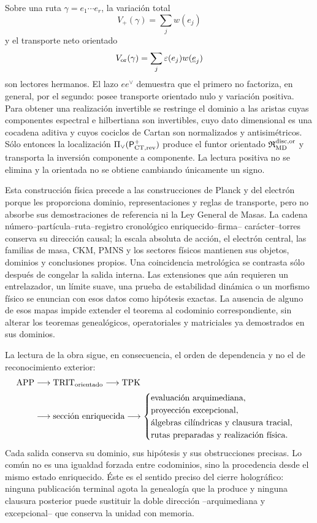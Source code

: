 Sobre una ruta \(\gamma=e_1\cdots e_r\), la variación total
\[
 V_+(\gamma)=\sum_jw(e_j)
\]
y el transporte neto orientado
\[
 V_{\rm or}(\gamma)=\sum_j\varepsilon(e_j)w(\underline e_j)
\]
son lectores hermanos. El lazo \(ee^\vee\) demuestra que el primero no
factoriza, en general, por el segundo: posee transporte orientado nulo y
variación positiva. Para obtener una realización invertible se restringe el
dominio a las aristas cuyas componentes espectral e hilbertiana son
invertibles, cuyo dato dimensional es una cocadena aditiva y cuyos cociclos de
Cartan son normalizados y antisimétricos. Sólo entonces la localización
\(\Pi_\vee(\mathsf P_{{\rm CT},{\rm rev}}^+)\) produce el funtor orientado
\(\mathfrak R_{\rm MD}^{\rm disc,or}\) y transporta la inversión componente a
componente. La lectura positiva no se elimina y la orientada no se obtiene
cambiando únicamente un signo.

Esta construcción física precede a las construcciones de Planck y del electrón
porque les proporciona dominio, representaciones y reglas de transporte, pero
no absorbe sus demostraciones de referencia ni la Ley General de Masas. La
cadena número--partícula--ruta--registro cronológico enriquecido--firma--
carácter--torres conserva su dirección causal; la escala absoluta de acción,
el electrón central, las familias de masa, CKM, PMNS y los sectores físicos
mantienen sus objetos, dominios y conclusiones propios. Una coincidencia metrológica se
contrasta sólo después de congelar la salida interna. Las extensiones que aún
requieren un entrelazador, un límite suave, una prueba de estabilidad dinámica
o un morfismo físico se enuncian con esos datos como hipótesis exactas. La
ausencia de alguno de esos mapas impide extender el teorema al codominio
correspondiente, sin alterar los teoremas genealógicos, operatoriales y
matriciales ya demostrados en sus dominios.

La lectura de la obra sigue, en consecuencia, el orden de dependencia y no el
de reconocimiento exterior:
\[
\begin{aligned}
 \mathrm{APP}&\longrightarrow\mathrm{TRIT}_{\rm orientado}
 \longrightarrow\mathrm{TPK}\\
 &\longrightarrow\text{sección enriquecida}
 \longrightarrow
 \begin{cases}
  \text{evaluación arquimediana},\\
  \text{proyección excepcional},\\
  \text{álgebras cilíndricas y clausura tracial},\\
  \text{rutas preparadas y realización física}.
 \end{cases}
\end{aligned}
\]
Cada salida conserva su dominio, sus hipótesis y sus obstrucciones precisas. Lo común no es
una igualdad forzada entre codominios, sino la procedencia desde el mismo
estado enriquecido. Éste es el sentido preciso del cierre holográfico: ninguna
publicación terminal agota la genealogía que la produce y ninguna clausura
posterior puede sustituir la doble dirección --arquimediana y excepcional--
que conserva la unidad con memoria.
